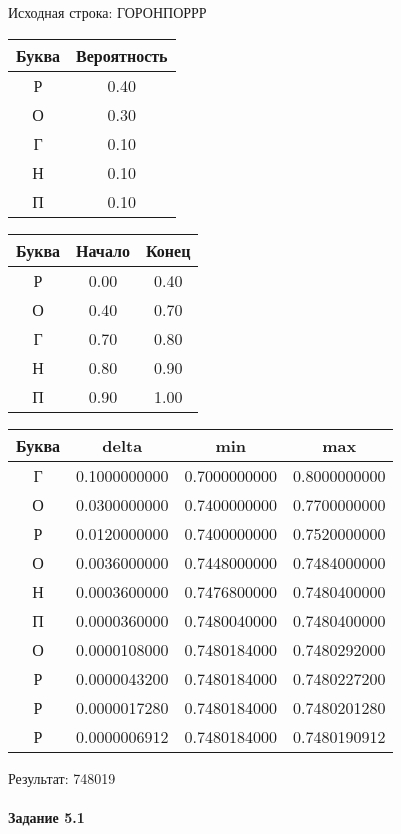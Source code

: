 \documentclass[a4paper, 12pt]{article}
\begin{document}
Исходная строка: ГОРОНПОРРР\
\begin{center}
 \begin{tabular}{ |c|c| } 
  \hline
     Буква & Вероятность \\ \hline
Р & 0.40\\\hline
О & 0.30\\\hline
Г & 0.10\\\hline
Н & 0.10\\\hline
П & 0.10
\\ \hline \end{tabular}
\end{center}
\begin{center}
 \begin{tabular}{ |c|c|c| } 
  \hline
     Буква & Начало & Конец \\ \hline
Р & 0.00 & 0.40\\\hline
О & 0.40 & 0.70\\\hline
Г & 0.70 & 0.80\\\hline
Н & 0.80 & 0.90\\\hline
П & 0.90 & 1.00
\\ \hline \end{tabular}
\end{center}
\begin{center}
 \begin{tabular}{ |c|c|c|c| } 
  \hline
     Буква & delta & min & max \\ \hline
Г & 0.1000000000 & 0.7000000000 & 0.8000000000\\\hline
О & 0.0300000000 & 0.7400000000 & 0.7700000000\\\hline
Р & 0.0120000000 & 0.7400000000 & 0.7520000000\\\hline
О & 0.0036000000 & 0.7448000000 & 0.7484000000\\\hline
Н & 0.0003600000 & 0.7476800000 & 0.7480400000\\\hline
П & 0.0000360000 & 0.7480040000 & 0.7480400000\\\hline
О & 0.0000108000 & 0.7480184000 & 0.7480292000\\\hline
Р & 0.0000043200 & 0.7480184000 & 0.7480227200\\\hline
Р & 0.0000017280 & 0.7480184000 & 0.7480201280\\\hline
Р & 0.0000006912 & 0.7480184000 & 0.7480190912
\\ \hline \end{tabular}
\end{center}
Результат: 748019
\pagebreak
\paragraph{Задание 5.1 \\
}
\end{document}
